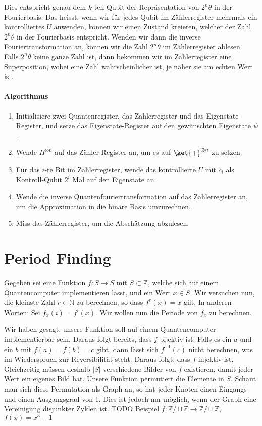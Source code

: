 Dies entspricht genau dem $k$-ten Qubit der Repräsentation von $2^n\theta$ in der Fourierbasis. Das heisst, wenn wir für jedes Qubit im Zählerregister mehrmals ein kontrolliertes $U$ anwenden, können wir einen Zustand kreieren, welcher der Zahl $2^n\theta$ in der Fourierbasis entspricht. Wenden wir dann die inverse Fouriertransformation an, können wir die Zahl $2^n\theta$ im Zählerregister ablesen. Falls $2^n\theta$ keine ganze Zahl ist, dann bekommen wir im Zählerregister eine Superposition, wobei eine Zahl wahrscheinlicher ist, je näher sie am echten Wert ist.

\paragraph{Algorithmus}
\begin{enumerate}
    \item Initialisiere zwei Quantenregister, das Zählerregister und das Eigenstate-Register, und setze das Eigenstate-Register auf den gewünschten Eigenstate $\psi$.
    \item Wende $H^{\otimes n}$ auf das Zähler-Register an, um es auf $\ket{+}^{\otimes n}$ zu setzen.
    \item Für das $i$-te Bit im Zählerregister, wende das kontrollierte $U$ mit $c_i$ als Kontroll-Qubit $2^i$ Mal auf den Eigenstate an.
    \item Wende die inverse Quantenfouriertransformation auf das Zählerregister an, um die Approximation in die binäre Basis umzurechnen.
    \item Miss das Zählerregister, um die Abschätzung abzulesen.
\end{enumerate}
 \newline

\section{Period Finding}
Gegeben sei eine Funktion $f : S \rightarrow S$ mit $S \subset \mathbb{Z}$, welche sich auf einem Quantencomputer implementieren lässt, und ein Wert $x \in S$. Wir versuchen nun, die kleinste Zahl $r \in \mathbb{N}$ zu berechnen, so dass $f^r(x) = x$ gilt. In anderen Worten: Sei $f_x(i) = f^i(x)$. Wir wollen nun die Periode von $f_x$ zu berechnen.

Wir haben gesagt, unsere Funktion soll auf einem Quantencomputer implementierbar sein. Daraus folgt bereits, dass $f$ bijektiv ist: Falls es ein $a$ und ein $b$ mit $f(a) = f(b) = c$ gibt, dann lässt sich $f^{-1}(c)$ nicht berechnen, was im Wiederspruch zur Reversibilität steht. Daraus folgt, dass $f$ injektiv ist. Gleichzeitig müssen deshalb $|S|$ verschiedene Bilder von $f$ existieren, damit jeder Wert ein eigenes Bild hat. Unsere Funktion permutiert die Elemente in $S$. Schaut man sich diese Permutation als Graph an, so hat jeder Knoten einen Eingangs- und einen Ausgangsgrad von 1. Dies ist jedoch nur möglich, wenn der Graph eine Vereinigung disjunkter Zyklen ist.
TODO Beispiel $f : \mathbb{Z} / 11 \mathbb{Z} \rightarrow \mathbb{Z} / 11 \mathbb{Z} $, $f(x) = x^3 - 1$
